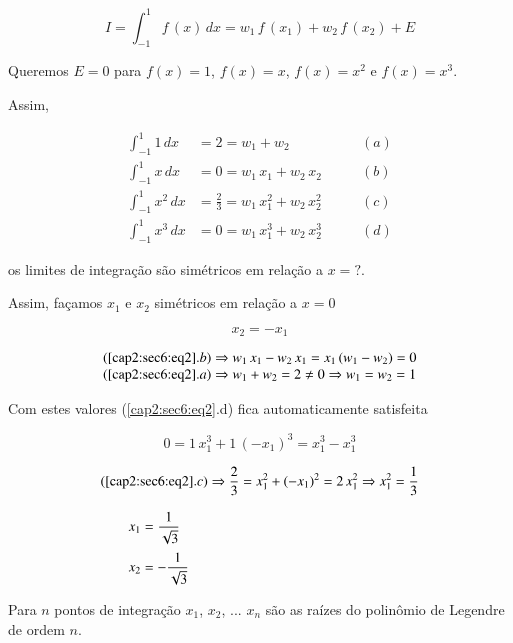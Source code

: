 \begin{enumerate}
\begin{equation}
 \label{cap2:sec6:eq1}
 I = \int_{-1}^1 f\,(x) \, dx = w_1 \, f\,(x_1) + w_2 \, f\,(x_2) + E
\end{equation}

Queremos $E=0$ para $f(x)=1$, $f(x)=x$, $f(x)=x^{2}$ e $f(x)=x^{3}$.

Assim,

\begin{equation}
 \label{cap2:sec6:eq2}
 \begin{array}{llr}
  \int_{-1}^1 1 \, dx & = 2 = w_1 + w_2 \qquad & (a) \\
  \int_{-1}^1 x \, dx & = 0 = w_1\,x_1 + w_2\,x_2 \qquad & (b) \\
  \int_{-1}^1 x^2 \, dx & = \displaystyle \frac{2}{3} = w_1\,x_1^2 + w_2\,x_2^2 \qquad & (c) \\
  \int_{-1}^1 x^3 \, dx & = 0 = w_1\,x_1^3 + w_2\,x_2^3 \qquad & (d)
 \end{array}
\end{equation}

os limites de integração são simétricos em relação a $x=?$.

Assim, façamos $x_{1}$ e $x_{2}$ simétricos em relação a $x=0$

\[x_{2} = -x_{1}\]

\[
 \begin{array}{l}
  (\ref{cap2:sec6:eq2}.b) \Rightarrow w_1\,x_1 - w_2\,x_1 = x_1\,(w_1 - w_2) = 0 \\
  (\ref{cap2:sec6:eq2}.a) \Rightarrow w_1 + w_2 = 2 \neq 0 \Rightarrow w_1 = w_2 = 1
 \end{array}
\]

Com estes valores (\ref{cap2:sec6:eq2}.d) fica automaticamente satisfeita

\[
 0 = 1\,x_1^3 + 1\,(-x_1)^3 = x_1^3 - x_1^3
\]

\[
 \begin{array}{l}
  (\ref{cap2:sec6:eq2}.c) \Rightarrow \displaystyle \frac{2}{3} = x_1^2 + (-x_1)^2 = 2\,x_1^2 \Rightarrow x_1^2 = \frac{1}{3} \\ \\
  \qquad x_1 = \displaystyle \frac{1}{\sqrt{3}} \vspace*{0.2cm} \\
  \qquad x_2 = - \displaystyle \frac{1}{\sqrt{3}}
 \end{array}
\]


Para $n$ pontos de integração $x_{1}$, $x_{2}$, ... $x_{n}$ são as raízes do polinômio de Legendre de ordem $n$.


\end{enumerate}
